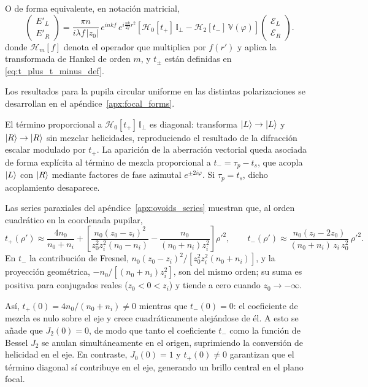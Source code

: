 O de forma equivalente, en notación matricial,
\begin{equation}
\boxed{
\begin{pmatrix} E'_L \\ E'_R \end{pmatrix}
=
\frac{\pi n}{i\lambda f\,|z_0|}\,e^{inkf}\,e^{i\frac{nk}{2f}r^2}
\left[
\mathscr H_0[t_+]\,\mathbb I_\perp
-
\mathscr H_2[t_-]\,\mathbb V(\varphi)
\right]
\begin{pmatrix} \mathscr E_L \\ \mathscr E_R \end{pmatrix}.
}
\label{eq:E_L_E_R_Hankel_matrix}
\end{equation}
donde $\mathscr H_m[f]$ denota el operador que multiplica por $f(r')$ y aplica la transformada de Hankel de orden $m$, y $t_\pm$ están definidas en \eqref{eq:t_plus_t_minus_def}.

Los resultados para la pupila circular uniforme en las distintas polarizaciones se desarrollan en el apéndice~\ref{apx:focal_forms}.

El término proporcional a $\mathscr{H}_0[t_+]\,\mathbb{I}_\perp$ es diagonal: transforma $\ket{L}\to\ket{L}$ y $\ket{R}\to\ket{R}$ sin mezclar helicidades, reproduciendo el resultado de la difracción escalar modulado por $t_+$. La aparición de la aberración vectorial queda asociada de forma explícita al término de mezcla proporcional a $t_-=\tau_p-t_s$, que acopla $\ket{L}$ con $\ket{R}$ mediante factores de fase azimutal $e^{\pm 2i\varphi}$. Si $\tau_p=t_s$, dicho acoplamiento desaparece.

Las series paraxiales del apéndice~\ref{apx:ovoids_series} muestran que, al orden cuadrático en la coordenada pupilar,
\begin{equation}
t_+(\rho')
\approx
\frac{4n_0}{n_0+n_i}
+
\left[
\frac{
n_0(z_0-z_i)^2
}{
z_0^2z_i^2(n_0-n_i)
}
-
\frac{n_0}{(n_0+n_i)z_i^2}
\right]\rho'^2,
\qquad
t_-(\rho')
\approx
\frac{
n_0(z_i-2z_0)
}{
(n_0+n_i)\,z_i\,z_0^2
}\,\rho'^2.
\label{eq:t_plus_t_minus_paraxial_second_order}
\end{equation}
En $t_-$ la contribución de Fresnel, $n_0(z_0-z_i)^2/[z_0^2z_i^2(n_0+n_i)]$, y la proyección geométrica, $-n_0/[(n_0+n_i)z_i^2]$, son del mismo orden; su suma es positiva para conjugados reales ($z_0<0<z_i$) y tiende a cero cuando $z_0\to-\infty$.

Así, $t_+(0)=4n_0/(n_0+n_i)\neq 0$ mientras que $t_-(0)=0$: el coeficiente de mezcla es nulo sobre el eje y crece cuadráticamente alejándose de él. A esto se añade que $J_2(0)=0$, de modo que tanto el coeficiente $t_-$ como la función de Bessel $J_2$ se anulan simultáneamente en el origen, suprimiendo la conversión de helicidad en el eje. En contraste, $J_0(0)=1$ y $t_+(0)\neq 0$ garantizan que el término diagonal sí contribuye en el eje, generando un brillo central en el plano focal.

